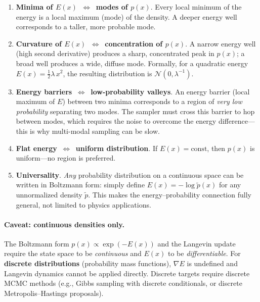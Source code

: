 \documentclass[12pt, a4paper]{article}
\begin{document}
\begin{enumerate}
    \item \textbf{Minima of $E(x)$ $\,\Longleftrightarrow\,$
          modes of $p(x)$}.
          Every local minimum of the energy is a local
          maximum (mode) of the density.  A deeper energy
          well corresponds to a taller, more probable mode.

    \item \textbf{Curvature of $E(x)$ $\,\Longleftrightarrow\,$
          concentration of $p(x)$}.
          A narrow energy well (high second derivative)
          produces a sharp, concentrated peak in $p(x)$;
          a broad well produces a wide, diffuse mode.
          Formally, for a quadratic energy
          $E(x) = \tfrac{1}{2}\lambda\,x^2$, the resulting
          distribution is
          $\mathcal{N}(0, \lambda^{-1})$.

    \item \textbf{Energy barriers $\,\Longleftrightarrow\,$
          low-probability valleys}.
          An energy barrier (local maximum of $E$) between
          two minima corresponds to a region of
          \emph{very low probability} separating two modes.
          The sampler must cross this barrier to hop between
          modes, which requires the noise to overcome the
          energy difference---this is why multi-modal sampling
          can be slow.

    \item \textbf{Flat energy $\,\Longleftrightarrow\,$
          uniform distribution}.
          If $E(x) = \text{const}$, then $p(x)$ is uniform---no
          region is preferred.

    \item \textbf{Universality}.
          \emph{Any} probability distribution on a continuous
          space can be written in Boltzmann form: simply define
          $E(x) = -\log \tilde{p}(x)$ for any unnormalized
          density $\tilde{p}$.  This makes the energy--probability
          connection fully general, not limited to physics
          applications.
\end{enumerate}

\paragraph{Caveat: continuous densities only.}
The Boltzmann form $p(x) \propto \exp(-E(x))$ and the Langevin
update require the state space to be \emph{continuous} and $E(x)$
to be \emph{differentiable}.  For \textbf{discrete distributions}
(probability mass functions), $\nabla E$ is undefined and Langevin
dynamics cannot be applied directly.  Discrete targets require
discrete MCMC methods (e.g., Gibbs sampling with discrete
conditionals, or discrete Metropolis--Hastings proposals).
\end{document}

